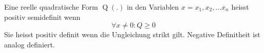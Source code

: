 Eine reelle quadratische Form $\operatorname{Q}(.)$ in den Variablen $x = x_1, x_2, \dots x_n$ heisst positiv semidefinit wenn
$$\forall x \neq 0 : Q \geq 0$$
Sie heisst positiv definit wenn die Ungleichung strikt gilt.
Negative Definitheit ist analog definiert.

